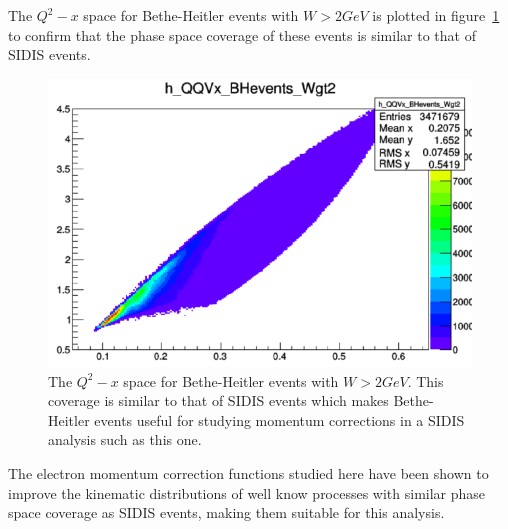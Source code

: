 The $Q^2-x$ space for Bethe-Heitler events with $W > 2 GeV$ is plotted in figure~\ref{fig:QQVx_BHevents} to confirm that the phase space coverage of these events is similar to that of SIDIS events.
%
\begin{figure}[htp]
\centering
\includegraphics[width=5in]{figures/QQVx_BHevents.png}
\caption{The $Q^2-x$ space for Bethe-Heitler events with $W > 2 GeV$. This coverage is similar to that of SIDIS events which makes Bethe-Heitler events useful for studying momentum corrections in a SIDIS analysis such as this one.}
\label{fig:QQVx_BHevents}
\end{figure}
%

The electron momentum correction functions studied here have been shown to improve the kinematic distributions of well know processes with similar phase space coverage as SIDIS events, making them suitable for this analysis.

\clearpage %
